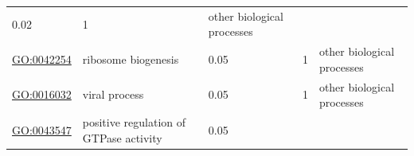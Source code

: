 \documentclass[
]{article}
\begin{document}
\begin{longtable}[]{@{}lllll@{}}
\begin{minipage}[t]{0.17\columnwidth}
0.02\strut
\end{minipage} & \begin{minipage}[t]{0.17\columnwidth}\raggedright
1\strut
\end{minipage} & \begin{minipage}[t]{0.17\columnwidth}\raggedright
other biological processes\strut
\end{minipage}\tabularnewline
\begin{minipage}[t]{0.17\columnwidth}\raggedright
\url{GO:0042254}\strut
\end{minipage} & \begin{minipage}[t]{0.17\columnwidth}\raggedright
ribosome biogenesis\strut
\end{minipage} & \begin{minipage}[t]{0.17\columnwidth}\raggedright
0.05\strut
\end{minipage} & \begin{minipage}[t]{0.17\columnwidth}\raggedright
1\strut
\end{minipage} & \begin{minipage}[t]{0.17\columnwidth}\raggedright
other biological processes\strut
\end{minipage}\tabularnewline
\begin{minipage}[t]{0.17\columnwidth}\raggedright
\url{GO:0016032}\strut
\end{minipage} & \begin{minipage}[t]{0.17\columnwidth}\raggedright
viral process\strut
\end{minipage} & \begin{minipage}[t]{0.17\columnwidth}\raggedright
0.05\strut
\end{minipage} & \begin{minipage}[t]{0.17\columnwidth}\raggedright
1\strut
\end{minipage} & \begin{minipage}[t]{0.17\columnwidth}\raggedright
other biological processes\strut
\end{minipage}\tabularnewline
\begin{minipage}[t]{0.17\columnwidth}\raggedright
\url{GO:0043547}\strut
\end{minipage} & \begin{minipage}[t]{0.17\columnwidth}\raggedright
positive regulation of GTPase activity\strut
\end{minipage} & \begin{minipage}[t]{0.17\columnwidth}\raggedright
0.05\strut
\end{minipage} & \begin{minipage}[t]{0.17\columnwidth}\raggedright

\end{minipage}
\end{longtable}
\end{document}
